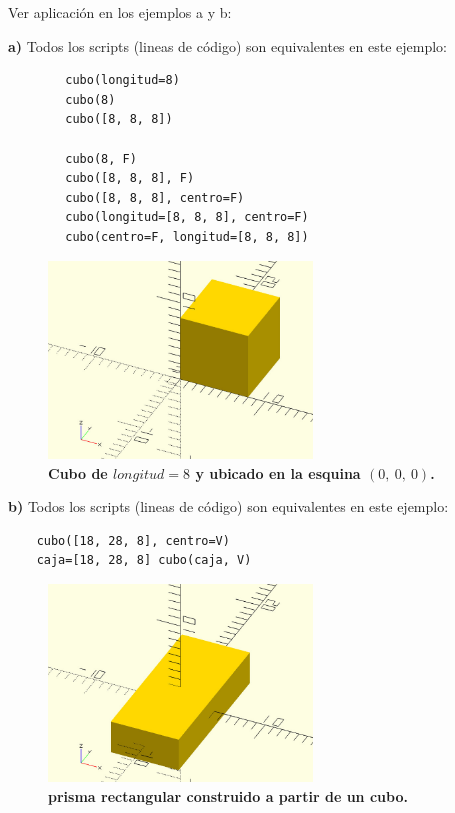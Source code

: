 Ver aplicación en los ejemplos a y b:

\textbf{a)} Todos los scripts (lineas de código) son equivalentes en este ejemplo: \begin{listing}[ht]
\begin{verbatim}
        cubo(longitud=8)
        cubo(8)
        cubo([8, 8, 8])
         
        cubo(8, F)
        cubo([8, 8, 8], F)
        cubo([8, 8, 8], centro=F)
        cubo(longitud=[8, 8, 8], centro=F)
        cubo(centro=F, longitud=[8, 8, 8])
\end{verbatim}
\end{listing}

\begin{figure}[h]
\includegraphics[width=7cm]{Img/Modelos/modelado1.jpg}
\centering
\caption{\textbf{\footnotesize{Cubo de $longitud = 8$ y ubicado en la esquina $(0,\ 0, \ 0)$. }}}
\end{figure}


\clearpage
\textbf{b)} Todos los scripts (lineas de código) son equivalentes en este ejemplo: \begin{listing}[ht]
\begin{verbatim}
    cubo([18, 28, 8], centro=V)
    caja=[18, 28, 8] cubo(caja, V)
\end{verbatim}
\end{listing}

\begin{figure}[h]
\includegraphics[width=7cm]{Img/Modelos/modelado2.jpg}
\centering
\caption{\textbf{\footnotesize{prisma rectangular construido a partir de un cubo. }}}
\end{figure}

